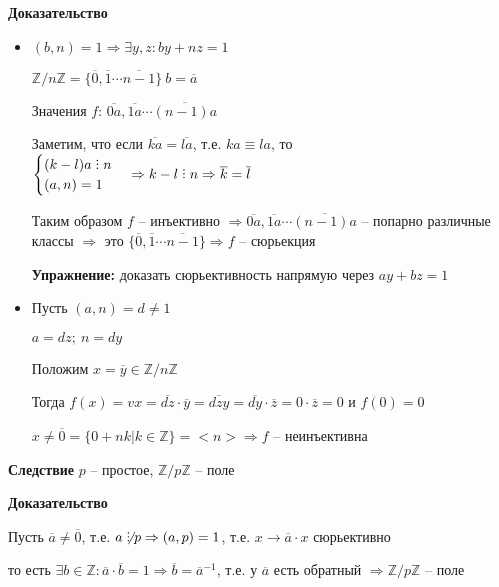 \documentclass[14pt, letter paper]{article}
\def\divby{%
  \mathrel{\text{\vbox{\baselineskip.65ex\lineskiplimit0pt\hbox{.}\hbox{.}\hbox{.}}}}%
}
\begin{document}
\begin{center}
    \textbf{Доказательство}
\end{center}

\begin{itemize}
    \item $(b,n) = 1 \Rightarrow \exists y, z: by + nz = 1$

    $\mathds{Z}/n\mathds{Z} = \{ \overline{0}, \overline{1} \cdots \overline{n-1} \}\ b = \overline{a}$

    Значения $f$: $\overline{0a}, \overline{1a} \cdots \overline{(n-1)a}$

    Заметим, что если $\overline{ka} = \overline{la}$, т.е. $ka \equiv la$, то $\begin{cases}
        (k-l)a \divby n \\
        (a,n) = 1
    \end{cases} \Rightarrow k-l \divby n \Rightarrow \overline{k} = \overline{l}$

    Таким образом $f$ -- инъективно $\Rightarrow \overline{0a}, \overline{1a} \cdots \overline{(n-1)a}$ -- попарно различные классы $\Rightarrow$ это $\{ \overline{0}, \overline{1} \cdots \overline{n-1}\} \Rightarrow f$ -- сюрьекция
    
    \textbf{Упражнение:} доказать сюрьективность напрямую через $ay + bz = 1$

    \item Пусть $(a,n) = d \neq 1$

    $a = dz;\ n = dy$

    Положим $x = \overline{y} \in \mathds{Z}/n\mathds{Z}$

    Тогда $f(x) = vx = \overline{dz} \cdot \overline{y} = \overline{dzy} = \overline{dy} \cdot \overline{z} = 0 \cdot \overline{z} = 0$ и $f(0) = 0$

    $x \neq \overline{0} = \{ 0 + nk | k \in \mathds{Z}\} = <n> \Rightarrow f$ -- неинъективна
\end{itemize}

\textbf{Следствие} $p$ -- простое, $\mathds{Z}/p\mathds{Z}$ -- поле

\begin{center}
    \textbf{Доказательство}
\end{center}

Пусть $\overline{a} \neq \overline{0}$, т.е. $a \not\divby p \Rightarrow (a,p) = 1$, т.е. $x \rightarrow \overline{a} \cdot x$ сюрьективно

то есть $\exists b \in \mathds{Z} : \overline{a} \cdot \overline{b} = 1 \Rightarrow \overline{b} = \overline{a}^{-1}$, т.е. у $\overline{a}$ есть обратный $\Rightarrow \mathds{Z}/p\mathds{Z}$ -- поле
\end{document}
